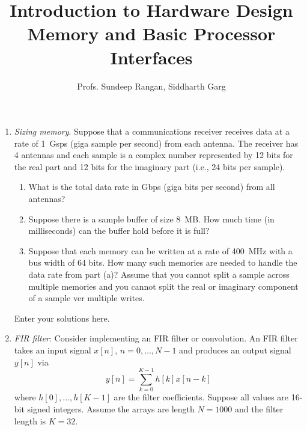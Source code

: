 \documentclass[11pt]{article}
\begin{document}
\title{Introduction to Hardware Design\\
Memory and Basic Processor Interfaces}
\author{Profs. Sundeep Rangan, Siddharth Garg}
\date{}

\maketitle

\begin{enumerate}
\item {} \emph{Sizing memory}.  Suppose that a communications receiver
receives data at a rate of \SI{1}{Gsps} (giga sample per second) from
each antenna.  The receiver has 4 antennas and each sample is a complex
number represented by 12 bits for the real part and 12 bits for the
imaginary part (i.e., 24 bits per sample).

\begin{enumerate}[label=(\alph*)]
\item What is the total data rate in Gbps (giga bits per second) from
  all antennas?
\item Suppose there is a sample buffer of size \SI{8}{MB}.  How much time
    (in milliseconds) can the buffer hold before it is full?
\item Suppose that each memory can be written at a rate of \SI{400}{MHz}
with a bus width of 64 bits.  How many such memories are needed to handle
the data rate from part (a)?  Assume that you cannot split a
sample across multiple memories and you cannot split the real or imaginary
component of a sample ver multiple writes.
\end{enumerate}

\begin{solution}
Enter your solutions here.
\end{solution}

\item {} \emph{FIR filter}:  
Consider implementing an FIR filter
or convolution.  An FIR filter takes an input signal $x[n]$, $n=0,\ldots,N-1$
 and produces
an output signal $y[n]$ via
\[
    y[n] = \sum_{k=0}^{K-1} h[k] x[n-k]
\]
where $h[0], \ldots, h[K-1]$ are the filter coefficients.  Suppose all values
are 16-bit signed integers.  Assume the arrays are length
$N=1000$ and the filter length is $K=32$.  


\end{enumerate}
\end{document}
